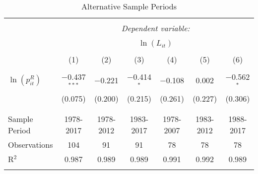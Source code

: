 
\begin{table}[!t] \centering 
  \caption{Alternative Sample Periods} 
  \label{industry_tab_F6} 
\begin{tabular}{@{\extracolsep{5pt}}lcccccc} 
\\[-1.8ex]\hline 
\hline \\[-1.8ex] 
 & \multicolumn{6}{c}{\textit{Dependent variable:}} \\ 
\cline{2-7} 
\\[-1.8ex] & \multicolumn{6}{c}{$\ln(L_{it})$} \\ 
\\[-1.8ex] & (1) & (2) & (3) & (4) & (5) & (6)\\ 
\hline \\[-1.8ex] 
 $\ln(p^{R}_{it})$ & $-$0.437$^{***}$ & $-$0.221 & $-$0.414$^{*}$ & $-$0.108 & 0.002 & $-$0.562$^{*}$ \\ 
  & (0.075) & (0.200) & (0.215) & (0.261) & (0.227) & (0.306) \\ 
  & & & & & & \\ 
\hline \\[-1.8ex] 
Sample Period & 1978-2017 & 1978-2012 & 1983-2017 & 1978-2007 & 1983-2012 & 1988-2017 \\ 
Observations & 104 & 91 & 91 & 78 & 78 & 78 \\ 
R$^{2}$ & 0.987 & 0.989 & 0.989 & 0.991 & 0.992 & 0.989 \\ 
\hline 
\hline \\[-1.8ex] 
\end{tabular} 
\end{table} 
